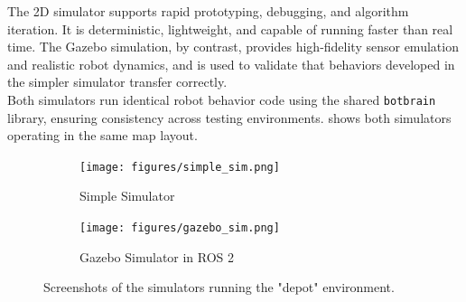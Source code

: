 The 2D simulator supports rapid prototyping, debugging, and algorithm iteration. It is deterministic, lightweight, and capable of running faster than real time. The Gazebo simulation, by contrast, provides high-fidelity sensor emulation and realistic robot dynamics, and is used to validate that behaviors developed in the simpler simulator transfer correctly.\\

Both simulators run identical robot behavior code using the shared \texttt{botbrain} library, ensuring consistency across testing environments.  shows both simulators operating in the same map layout.

\begin{figure}[h]
    \centering
    \begin{subfigure}[b]{0.45\textwidth}
        \centering
        \texttt{[image: figures/simple\_sim.png]}
        \caption{Simple Simulator}
    \end{subfigure}
    \hfill
    \begin{subfigure}[b]{0.45\textwidth}
        \centering
        \texttt{[image: figures/gazebo\_sim.png]}
        \caption{Gazebo Simulator in ROS 2}
    \end{subfigure}
    \caption{Screenshots of the simulators running the "depot" environment.}
    \label{fig:simulators}
\end{figure}

